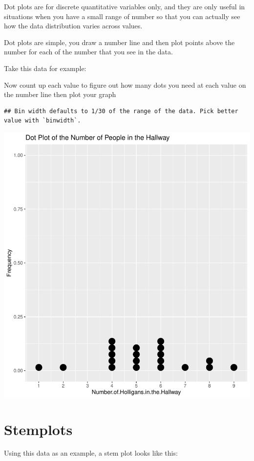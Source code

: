 \documentclass[
]{book}
\begin{document}
Dot plots are for discrete quantitative variables only, and they are
only useful in situations when you have a small range of number so that
you can actually see how the data distribution varies across values.

Dot plots are simple, you draw a number line and then plot points above
the number for each of the number that you see in the data.

Take this data for example:

Now count up each value to figure out how many dots you need at each
value on the number line then plot your graph

\begin{verbatim}
## Bin width defaults to 1/30 of the range of the data. Pick better value with `binwidth`.
\end{verbatim}

\includegraphics{_main_files/figure-latex/unnamed-chunk-16-1.pdf}

\hypertarget{stemplots}{%
\section{Stemplots}\label{stemplots}}

Using this data as an example, a stem plot looks like this:
\end{document}
